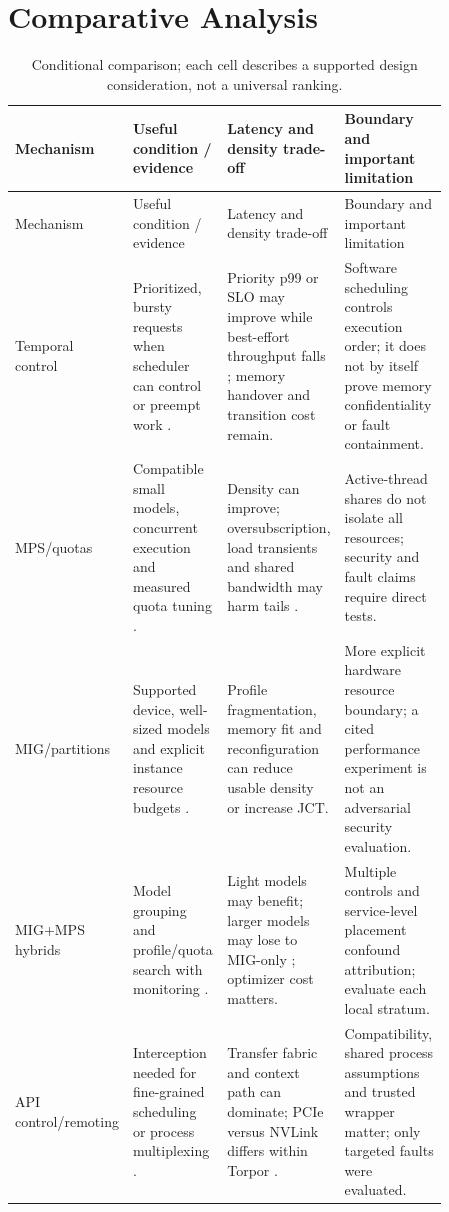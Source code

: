 \documentclass[12pt,a4paper]{article}
\begin{document}
\section{Comparative Analysis}
\begin{longtable}{P{0.17\linewidth}P{0.22\linewidth}P{0.22\linewidth}P{0.25\linewidth}}
\caption{Conditional comparison; each cell describes a supported design consideration, not a universal ranking.}\label{tab:matrix}\\\toprule
Mechanism & Useful condition / evidence & Latency and density trade-off & Boundary and important limitation\\\midrule\endfirsthead
\toprule Mechanism & Useful condition / evidence & Latency and density trade-off & Boundary and important limitation\\\midrule\endhead
Temporal control & Prioritized, bursty requests when scheduler can control or preempt work \cite{clockwork,reef,xsched,split}. & Priority p99 or SLO may improve while best-effort throughput falls \cite{reef,tally}; memory handover and transition cost remain. & Software scheduling controls execution order; it does not by itself prove memory confidentiality or fault containment.\\
MPS/quotas & Compatible small models, concurrent execution and measured quota tuning \cite{gpulet,gslice,vastpipe,deinfer}. & Density can improve; oversubscription, load transients and shared bandwidth may harm tails \cite{igniter,interference_deeper}. & Active-thread shares do not isolate all resources; security and fault claims require direct tests.\\
MIG/partitions & Supported device, well-sized models and explicit instance resource budgets \cite{gnntriton,dynap}. & Profile fragmentation, memory fit and reconfiguration can reduce usable density or increase JCT. & More explicit hardware resource boundary; a cited performance experiment is not an adversarial security evaluation.\\
MIG+MPS hybrids & Model grouping and profile/quota search with monitoring \cite{parva,miger,boer}. & Light models may benefit; larger models may lose to MIG-only \cite{boer}; optimizer cost matters. & Multiple controls and service-level placement confound attribution; evaluate each local stratum.\\
API control/remoting & Interception needed for fine-grained scheduling or process multiplexing \cite{torpor,krypton,orion}. & Transfer fabric and context path can dominate; PCIe versus NVLink differs within Torpor \cite{torpor}. & Compatibility, shared process assumptions and trusted wrapper matter; only targeted faults were evaluated.\\
\bottomrule\end{longtable}
\end{document}
